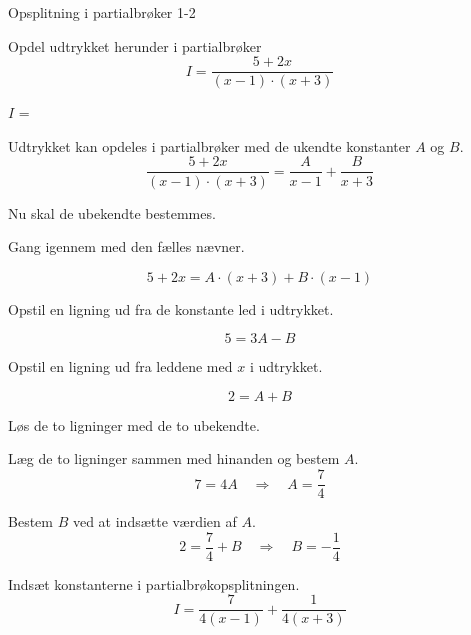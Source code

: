 \documentclass{article}
\begin{document}
\begin{exercise}{Opsplitning i partialbrøker 1-2}
	
	Opdel udtrykket herunder i partialbrøker
	\[
	I = \frac{5 + 2x}{(x - 1) \cdot (x + 3)}
	\]
	
	$I$ =  
	
	\hint
	Udtrykket kan opdeles i partialbrøker med de ukendte konstanter $A$ og $B$.
	\[
	\frac{5 + 2x}{(x - 1) \cdot (x + 3)} = 
	\frac{A}{x - 1} + \frac{B}{x + 3}
	\]
	
	\hint
	Nu skal de ubekendte bestemmes.
	
	\hint
	Gang igennem med den fælles nævner.
	
	\hint
	\[
	5 + 2x = A \cdot (x + 3) + B \cdot (x - 1)
	\]
	
	\hint
	Opstil en ligning ud fra de konstante led i udtrykket.
	
	\hint
	\[
	5 = 3A - B
	\]
	
	\hint
	Opstil en ligning ud fra leddene med $x$ i udtrykket.
	
	\hint
	\[
	2 = A + B
	\]
	
	\hint
	Løs de to ligninger med de to ubekendte.
	
	\hint
	Læg de to ligninger sammen med hinanden og bestem $A$.
	\[
	7 = 4A \quad	\Rightarrow		\quad		A = \frac{7}{4}
	\]
	
	\hint
	Bestem $B$ ved at indsætte værdien af $A$.
	\[
	2 =  \frac{7}{4} + B \quad 	\Rightarrow		\quad B = -\frac{1}{4}
	\]
	
	\hint
	Indsæt konstanterne i partialbrøkopsplitningen.
	\[
	I = \frac{7}{4(x-1)} + \frac{1}{4(x+3)}
	\]
	
	
	
\end{exercise}
\end{document}
